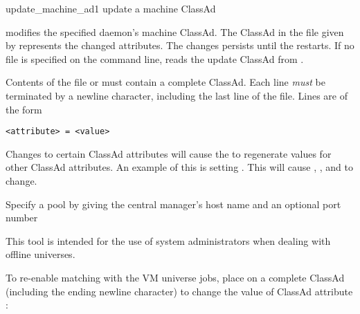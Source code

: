 \begin{ManPage}{}{update_machine_ad}{1}
{update a machine ClassAd}

\Synopsis {}
\ToolArgsBase


\Description
{} modifies the specified 
daemon's machine ClassAd.
The ClassAd in the file given by 
represents the changed attributes.
The changes persists until the  restarts.
If no file is specified on the command line, 
reads the update ClassAd from .

Contents of the file or  must contain a complete
ClassAd.
Each line \emph{must} be terminated by a newline character,
including the last line of the file.
Lines are of the form

\begin{verbatim}
<attribute> = <value>
\end{verbatim}

Changes to certain ClassAd attributes will cause the 
 to regenerate values for other ClassAd attributes.
An example of this is setting .
This will cause ,
, and  to change.

\begin{Options}
    {Specify a pool by giving the
     central manager's host name and an optional port number}
\end{Options}

\GenRem

This tool is intended for the use of system administrators when dealing
with offline universes.  

\Examples

To re-enable matching with the VM universe jobs,
place on  a complete
ClassAd (including the ending newline character) to
change the value of ClassAd attribute :


\end{ManPage}
